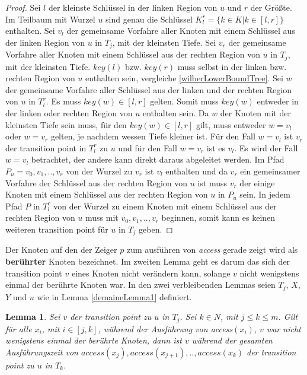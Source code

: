 \documentclass[a4paper,12pt]{article}
\begin{document}
\begin{proof}
Sei $l$ der kleinste Schlüssel in der linken Region von $u$ und $r$ der Größte. Im Teilbaum mit Wurzel $u$ sind genau die Schlüssel $K^r_l = \{k \in K \vert k \in \left[l,r\right]\}$ enthalten. Sei $v_l$ der gemeinsame Vorfahre aller Knoten mit einem Schlüssel aus der linken Region von $u$ in $T_j$, mit der kleinsten Tiefe. Sei $v_r$ der gemeinsame Vorfahre aller Knoten mit einem Schlüssel aus der rechten Region von $u$ in $T_j$, mit der kleinsten Tiefe. $\mathit{key\left(l\right)}$ bzw. $\mathit{key\left(r\right)}$ muss selbst in der linken bzw. rechten Region von $u$ enthalten sein, vergleiche \ref{wilberLowerBoundTree}. Sei $w$ der gemeinsame Vorfahre aller Schlüssel aus der linken und der rechten Region von $u$ in $T^r_l$. Es muss $\mathit{key}\left(w\right) \in \left[l,r\right]$ gelten. Somit muss  $\mathit{key}\left(w\right)$ entweder in der linken oder rechten Region von $u$ enthalten sein. Da $w$ der Knoten mit der kleinsten Tiefe sein muss, für den  $\mathit{key\left(w\right)} \in \left[l,r\right]$  gilt, muss entweder $w = v_l$ oder $w = v_r$ gelten, je nachdem wessen Tiefe kleiner ist. Für den Fall $w = v_l$ ist $v_r$ der transition point in $T^r_l$ zu $u$ und für den Fall $w = v_r$ ist es $v_l$.
Es wird der Fall $w = v_l$ betrachtet, der andere kann direkt daraus abgeleitet werden. Im Pfad $P_u = v_0,v_1,..,v_r$ von der Wurzel zu $v_r$ ist $v_l$ enthalten und da $v_r$ ein gemeinsamer Vorfahre der Schlüssel aus der rechten Region von $u$ ist muss $v_r$ der einige Knoten mit einem Schlüssel aus der rechten Region von $u$ in $P_u$ sein. In jedem Pfad $P$ in $T_l^r$ von der Wurzel zu einem Knoten mit einem Schlüssel aus der rechten Region von $u$ muss mit $v_0,v_1,..,v_r$ beginnen, somit kann es keinen weiteren transition point für $u$ in $T_j$ geben. 
	
\end{proof}
\noindent Der Knoten auf den der Zeiger $p$ zum ausführen von \textit{access} gerade zeigt wird als \textbf{berührter} Knoten bezeichnet.
 Im zweiten Lemma geht es darum das sich der transition point $v$ eines Knoten nicht verändern kann, solange $v$ nicht wenigstens einmal der berührte Knoten war. In den zwei verbleibenden Lemmas seien  $T_j$, $X$, $Y$ und $u$ wie in  Lemma \ref{demaineLemma1} definiert. 



\newtheorem{Lemma5}{Lemma}[section] \label{lemmaDemaine2}
\begin{Lemma5} \label{demaineLemma2}
Sei $v$ der transition point zu $u$ in $T_j$.  Sei  $k \in \mathit{N}$, mit $j \leq k \leq m$. Gilt für alle $x_i$, mit $i \in \left[j,k\right]$, während der Ausführung von \textit{access}$\left(x_i\right)$,  $v$ war nicht wenigstens einmal der berührte Knoten, dann ist $v$ während der gesamten Ausführungszeit von $\textit{access}\left(x_j\right),\textit{access}\left(x_{j+1}\right),..,\textit{access}\left(x_k\right)$ der transition point zu $u$ in $T_k$. 
\end{Lemma5}
\end{document}
